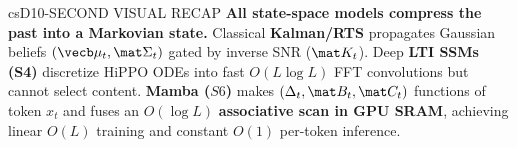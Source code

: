 \documentclass[../../../../master.tex]{subfiles}
\begin{document}
\begin{cscolumns}
\begin{cscard}{csD}{10-SECOND VISUAL RECAP}
  \sffamily\footnotesize
  \textbf{All state-space models compress the past into a Markovian state.} Classical \textbf{Kalman/RTS} propagates Gaussian beliefs $(\vecb\mu_t,\mat\Sigma_t)$ gated by inverse SNR ($\mat K_t$). Deep \textbf{LTI SSMs (S4)} discretize HiPPO ODEs into fast $O(L\log L)$ FFT convolutions but cannot select content. \textbf{Mamba ($S6$)} makes $(\Delta_t,\mat B_t,\mat C_t)$ functions of token $x_t$ and fuses an $O(\log L)$ \textbf{associative scan in GPU SRAM}, achieving linear $O(L)$ training and constant $O(1)$ per-token inference.
\end{cscard}
\end{cscolumns}

\csend
\end{document}
